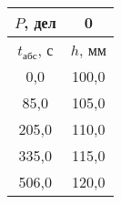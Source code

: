 \begin{tabular}[t]{|c|c|}
\hline
$P$, дел & 0 \\
\hline
$t_{абс}$, с & $h$, мм \\ 
\hline
0,0 & 100,0 \\ 
85,0 & 105,0 \\ 
205,0 & 110,0 \\ 
335,0 & 115,0 \\ 
506,0 & 120,0 \\ 
\hline
\end{tabular}